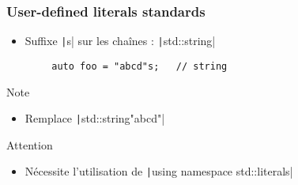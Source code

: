 \documentclass[C++.tex]{subfiles}
\begin{document}
\begin{frame}[fragile]
	\frametitle{User-defined literals standards}
	\begin{itemize}
		\item Suffixe \texttt|s| sur les chaînes : \texttt|std::string|
	\end{itemize}

	\begin{verbatim}
		auto foo = "abcd"s;   // string
	\end{verbatim}

	\begin{block}{Note}
		\begin{itemize}
			\item Remplace \texttt|std::string{"abcd"}|
		\end{itemize}
	\end{block}

	\begin{alertblock}{Attention}
		\begin{itemize}
			\item Nécessite l'utilisation de \texttt|using namespace std::literals|
		\end{itemize}
	\end{alertblock}


\end{frame}
\end{document}
